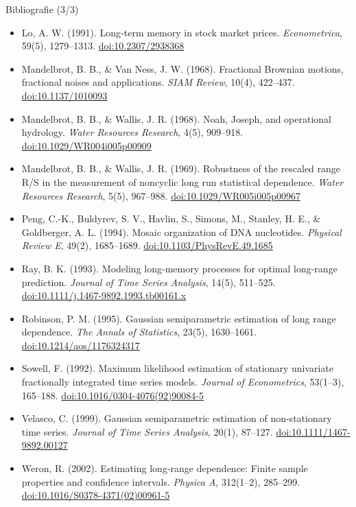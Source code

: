 \begin{frame}{Bibliografie (3/3)}
\itemsize{\scriptsize}
\begin{itemize}
    \item Lo, A. W. (1991). Long-term memory in stock market prices. \textit{Econometrica}, 59(5), 1279--1313. \href{https://doi.org/10.2307/2938368}{doi:10.2307/2938368}
    \item Mandelbrot, B. B., \& Van Ness, J. W. (1968). Fractional Brownian motions, fractional noises and applications. \textit{SIAM Review}, 10(4), 422--437. \href{https://doi.org/10.1137/1010093}{doi:10.1137/1010093}
    \item Mandelbrot, B. B., \& Wallis, J. R. (1968). Noah, Joseph, and operational hydrology. \textit{Water Resources Research}, 4(5), 909--918. \href{https://doi.org/10.1029/WR004i005p00909}{doi:10.1029/WR004i005p00909}
    \item Mandelbrot, B. B., \& Wallis, J. R. (1969). Robustness of the rescaled range R/S in the measurement of noncyclic long run statistical dependence. \textit{Water Resources Research}, 5(5), 967--988. \href{https://doi.org/10.1029/WR005i005p00967}{doi:10.1029/WR005i005p00967}
    \item Peng, C.-K., Buldyrev, S. V., Havlin, S., Simons, M., Stanley, H. E., \& Goldberger, A. L. (1994). Mosaic organization of DNA nucleotides. \textit{Physical Review E}, 49(2), 1685--1689. \href{https://doi.org/10.1103/PhysRevE.49.1685}{doi:10.1103/PhysRevE.49.1685}
    \item Ray, B. K. (1993). Modeling long-memory processes for optimal long-range prediction. \textit{Journal of Time Series Analysis}, 14(5), 511--525. \href{https://doi.org/10.1111/j.1467-9892.1993.tb00161.x}{doi:10.1111/j.1467-9892.1993.tb00161.x}
    \item Robinson, P. M. (1995). Gaussian semiparametric estimation of long range dependence. \textit{The Annals of Statistics}, 23(5), 1630--1661. \href{https://doi.org/10.1214/aos/1176324317}{doi:10.1214/aos/1176324317}
    \item Sowell, F. (1992). Maximum likelihood estimation of stationary univariate fractionally integrated time series models. \textit{Journal of Econometrics}, 53(1--3), 165--188. \href{https://doi.org/10.1016/0304-4076(92)90084-5}{doi:10.1016/0304-4076(92)90084-5}
    \item Velasco, C. (1999). Gaussian semiparametric estimation of non-stationary time series. \textit{Journal of Time Series Analysis}, 20(1), 87--127. \href{https://doi.org/10.1111/1467-9892.00127}{doi:10.1111/1467-9892.00127}
    \item Weron, R. (2002). Estimating long-range dependence: Finite sample properties and confidence intervals. \textit{Physica A}, 312(1--2), 285--299. \href{https://doi.org/10.1016/S0378-4371(02)00961-5}{doi:10.1016/S0378-4371(02)00961-5}
\end{itemize}
\end{frame}



